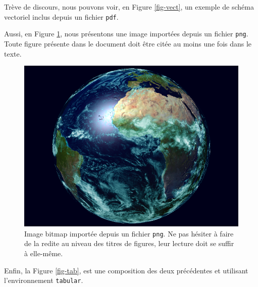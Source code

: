 \documentclass[a4paper, 12pt]{book}
\begin{document}
Trève de discours, nous pouvons voir, en Figure \ref{fig-vect}, un
exemple de schéma vectoriel inclus depuis un fichier
\texttt{pdf}. 

Aussi, en Figure \ref{fig-bmp}, nous présentons une
image importées depuis un fichier \texttt{png}. Toute figure présente
dans le document doit être citée au moins une fois dans le
texte. 

\begin{figure}[htbp]
  \centering
  \includegraphics[width=0.5\linewidth]{images/earth_06_rendu_final.png}
  \caption{Image bitmap importée depuis un fichier \texttt{png}. Ne
    pas hésiter à faire de la redite au niveau des titres de
    figures, leur lecture doit se suffir à elle-même.\label{fig-bmp}}
\end{figure}




Enfin, la Figure \ref{fig-tab}, est une composition des deux
précédentes et utilisant l'environnement \texttt{tabular}.
\end{document}

